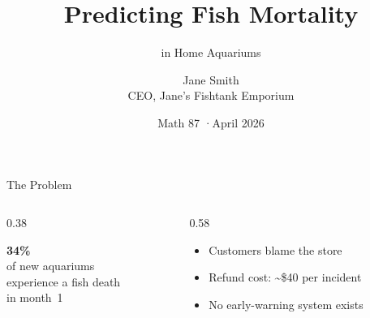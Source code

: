 \documentclass[aspectratio=169]{beamer}
\title{Predicting Fish Mortality}
\subtitle{in Home Aquariums}
\author{Jane Smith \\ \small CEO, Jane's Fishtank Emporium}
\date{Math 87 \quad·\quad April 2026}
\begin{document}
\maketitle


\begin{frame}{The Problem}

  \begin{columns}[T]

    \begin{column}{0.38\textwidth}
      \begin{center}
        \colorbox{deepblue}{\parbox{0.9\textwidth}{%
          \vspace{0.6em}
          \begin{center}
            {\color{white}\fontsize{52}{56}\selectfont\textbf{34\%}}\\[0.4em]
            {\color{lightblue}\small of new aquariums\\
             experience a fish death\\
             in month~1}
          \end{center}
          \vspace{0.6em}
        }}
      \end{center}
    \end{column}

    \begin{column}{0.58\textwidth}
      \vspace{1.2em}
      \begin{itemize}
        \setlength{\itemsep}{1.0em}
        \item[\textcolor{warncolor}{\textbf{!}}]
              Customers blame the store
        \item[\textcolor{warncolor}{\textbf{!}}]
              Refund cost: \textasciitilde\$40 per incident
        \item[\textcolor{warncolor}{\textbf{!}}]
              No early-warning system exists
      \end{itemize}
    \end{column}

  \end{columns}

\end{frame}
\end{document}
